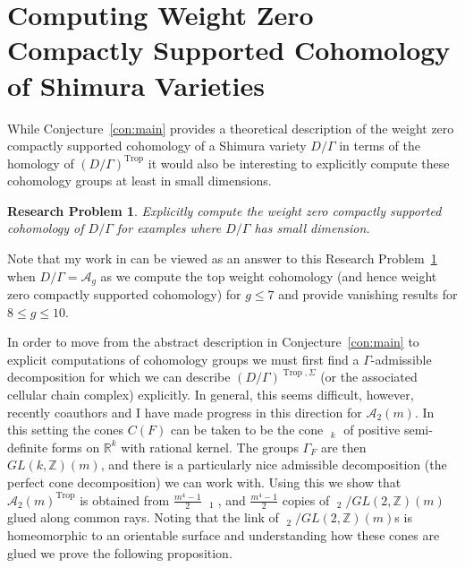 \documentclass[11pt,reqno]{amsart}
\newtheorem{problem}[lemma]{Research Problem}
\theoremstyle{remark}
\newcommand{\GL}{{GL}}
\newcommand{\RR}{\mathbb{R}}
\newcommand{\ZZ}{\mathbb{Z}}
\newcommand{\cA}{\mathcal{A}}
\DeclareMathOperator{\Trop}{Trop}
\DeclareMathOperator{\PDrt}{PD^{rt}}
\begin{document}
 

\section{Computing Weight Zero Compactly Supported Cohomology of Shimura Varieties }\label{sec:computing}

While Conjecture~\ref{con:main} provides a theoretical description of the weight zero compactly supported cohomology of a Shimura variety $D/\Gamma$ in terms of the homology of $(D/\Gamma)^{\Trop}$ it would also be interesting to explicitly compute these cohomology groups at least in small dimensions.

\begin{problem}\label{rp:compute}
Explicitly compute the weight zero compactly supported cohomology of $D/\Gamma$ for examples where $D/\Gamma$ has small dimension.
\end{problem}

Note that my work in \cite{BBCMMW24} can be viewed as an answer to this Research Problem~\ref{rp:compute} when $D/\Gamma=\cA_{g}$ as we compute the top weight cohomology (and hence weight zero compactly supported cohomology) for $g\leq 7$ and provide vanishing results for $8\leq g\leq 10$. 

In order to move from the abstract description in Conjecture~\ref{con:main} to explicit computations of cohomology groups we must first find a $\Gamma$-admissible decomposition for which we can describe $(D/\Gamma)^{\Trop,\Sigma}$ (or the associated cellular chain complex) explicitly. In general, this seems  difficult, however, recently coauthors and I have made progress in this direction for $\cA_{2}(m)$. In this setting the cones $C(F)$ can be taken to be the cone $\PDrt_{k}$ of positive semi-definite forms on $\RR^{k}$ with rational kernel. The groups $\Gamma_{F}$ are then $\GL(k,\ZZ)(m)$, and there is a particularly nice admissible decomposition (the perfect cone decomposition) we can work with. Using this we show that  $\cA_2(m)^{\Trop}$ is obtained from $\frac{m^4 - 1}{2}$ $\PDrt_{1}$, and $\frac{m^4 - 1}{2}$ copies of $\PDrt_{2}/\GL(2,\ZZ)(m)$ glued along common rays. Noting that the link of $\PDrt_{2}/\GL(2,\ZZ)(m)$s is homeomorphic to an orientable surface and understanding how these cones are glued we prove the following proposition.
\end{document}
